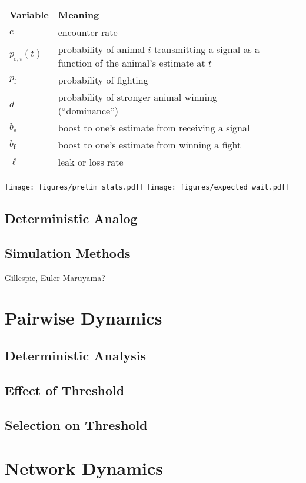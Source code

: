 \documentclass{article}
\begin{document}
\begin{table}
\caption{\label{variables}}
\begin{tabular}{llll}
Variable & Meaning  \\
\hline $e$ & encounter rate
\\ $p_{\text{s},i}(t)$ & probability of animal $i$ transmitting a signal as a function of the animal's estimate at $t$
\\ $p_{\text{f}}$ & probability of fighting
\\ $d$ & probability of stronger animal winning (``dominance'')
\\ $b_{\text{s}}$ & boost to one's estimate from receiving a signal
\\ $b_{\text{f}}$ & boost to one's estimate from winning a fight
\\ $\ell$ & leak or loss rate
\end{tabular}
\end{table}

\texttt{[image: figures/prelim\_stats.pdf]}
\texttt{[image: figures/expected\_wait.pdf]}

\subsection{Deterministic Analog}
\subsection{Simulation Methods}
Gillespie, Euler-Maruyama?
\section{Pairwise Dynamics}
\subsection{Deterministic Analysis}
\subsection{Effect of Threshold}
\subsection{Selection on Threshold}

\section{Network Dynamics}
\end{document}
